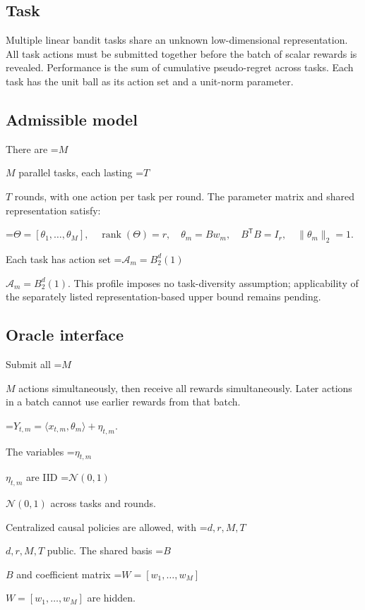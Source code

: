 \documentclass[10pt,a4paper]{article}
\newcommand{\AtlasMath}[1]{\par\begingroup\centering\setbox0=\hbox{$\displaystyle #1$}\ifdim\wd0>1.4\linewidth\typeout{ATLAS WIDE FORMULA: \the\wd0}\fi\ifdim\wd0>\linewidth\resizebox{\linewidth}{!}{\box0}\else\box0\fi\par\endgroup}
\newcommand{\AtlasInlineMath}[1]{\begingroup\setbox0=\hbox{$#1$}\ifdim\wd0>.4\linewidth\endgroup\AtlasMath{#1}\else\endgroup$#1$\fi}
\begin{document}
\subsection{Task}


Multiple linear bandit tasks share an unknown low-dimensional representation. All task actions must be submitted together before the batch of scalar rewards is revealed. Performance is the sum of cumulative pseudo-regret across tasks. Each task has the unit ball as its action set and a unit-norm parameter.



\subsection{Admissible model}


There are \AtlasInlineMath{M} parallel tasks, each lasting \AtlasInlineMath{T} rounds, with one action per task per round. The parameter matrix and shared representation satisfy:




\AtlasMath{\Theta=[\theta_1,\ldots,\theta_M],\quad \operatorname{rank}(\Theta)=r,\quad \theta_m=Bw_m,\quad B^{\mathsf T}B=I_r,\quad \|\theta_m\|_2=1.}




Each task has action set \AtlasInlineMath{\mathcal{A}_m=B_2^d(1)}. This profile imposes no task-diversity assumption; applicability of the separately listed representation-based upper bound remains pending.



\subsection{Oracle interface}


Submit all \AtlasInlineMath{M} actions simultaneously, then receive all rewards simultaneously. Later actions in a batch cannot use earlier rewards from that batch.




\AtlasMath{Y_{t,m}=\langle x_{t,m},\theta_m\rangle+\eta_{t,m}.}




The variables \AtlasInlineMath{\eta_{t,m}} are IID \AtlasInlineMath{\mathcal N(0,1)} across tasks and rounds.



Centralized causal policies are allowed, with \AtlasInlineMath{d,r,M,T} public. The shared basis \AtlasInlineMath{B} and coefficient matrix \AtlasInlineMath{W=[w_1,\ldots,w_M]} are hidden.
\end{document}
